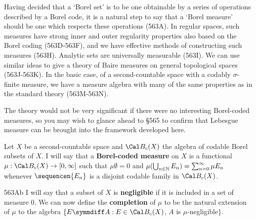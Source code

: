 
\def\chaptername{Choice and determinacy}
\def\sectionname{Borel measures without choice}


Having decided that a `Borel set' is to be one obtainable by
a series of operations described by a Borel code, it is a natural step to
say that a `Borel measure' should be one which respects these operations
(563A).   In regular spaces, such measures have strong inner and outer
regularity properties also based on the Borel coding (563D-563F), and we
have effective methods of constructing such measures (563H).   Analytic
sets are universally measurable (563I).   We can use similar ideas to give
a theory of Baire measures on general topological spaces (563J-563K).
In the basic case, of a second-countable space with a codably
$\sigma$-finite measure, we have a measure algebra with many of the same
properties as in the standard theory (563M-563N).

The theory would not be very significant if there were no interesting
Borel-coded measures, so you may wish to glance ahead to \S565 to confirm
that Lebesgue measure can be brought into the framework developed here.

Let $X$ be a second-countable space and
$\Cal B_c(X)$ the algebra of codable Borel subsets of $X$.
I will say that a {\bf Borel-coded measure} on $X$ is a functional
$\mu:\Cal B_c(X)\to[0,\infty]$ such that
$\mu\emptyset=0$ and
$\mu(\bigcup_{n\in\Bbb N}E_n)=\sum_{n=0}^{\infty}\mu E_n$ whenever
$\sequencen{E_n}$ is a disjoint codable family in $\Cal B_c(X)$.


\spheader 563Ab
I
will say that a subset of $X$ is {\bf negligible} if it is
included in a set of measure $0$.   We can now define the {\bf completion} of $\mu$ to be the
natural extension of $\mu$ to the algebra
$\{E\symmdiff A:E\in\Cal B_c(X)$, $A$ is $\mu$-negligible$\}$.

